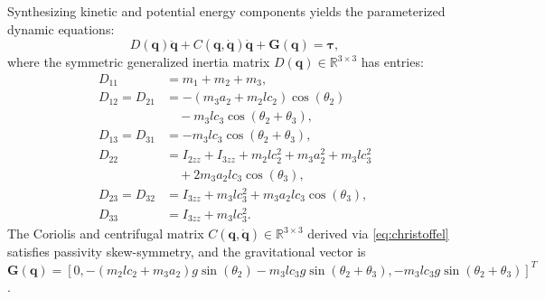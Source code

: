 \documentclass[lettersize,journal]{IEEEtran}
\begin{document}
Synthesizing kinetic and potential energy components yields the parameterized dynamic equations:
\begin{equation}
    D(\bm{q})\ddot{\bm{q}} + C(\bm{q}, \dot{\bm{q}})\dot{\bm{q}} + \bm{G}(\bm{q}) = \bm{\tau},
    \label{eq:dipc_dynamics}
\end{equation}
where the symmetric generalized inertia matrix $D(\bm{q}) \in \mathbb{R}^{3 \times 3}$ has entries:
\begin{align}
    D_{11} &= m_1 + m_2 + m_3, \label{eq:D11_dipc} \\
    D_{12} = D_{21} &= -(m_3 a_2 + m_2 lc_2)\cos(\theta_2) \nonumber \\
                    &\quad - m_3 lc_3 \cos(\theta_2 + \theta_3), \label{eq:D12_dipc} \\
    D_{13} = D_{31} &= -m_3 lc_3 \cos(\theta_2 + \theta_3), \label{eq:D13_dipc} \\
    D_{22} &= I_{2zz} + I_{3zz} + m_2 lc_2^2 + m_3 a_2^2 + m_3 lc_3^2 \nonumber \\
           &\quad + 2 m_3 a_2 lc_3 \cos(\theta_3), \label{eq:D22_dipc} \\
    D_{23} = D_{32} &= I_{3zz} + m_3 lc_3^2 + m_3 a_2 lc_3 \cos(\theta_3), \label{eq:D23_dipc} \\
    D_{33} &= I_{3zz} + m_3 lc_3^2. \label{eq:D33_dipc}
\end{align}
The Coriolis and centrifugal matrix $C(\bm{q}, \dot{\bm{q}}) \in \mathbb{R}^{3 \times 3}$ derived via \eqref{eq:christoffel} satisfies passivity skew-symmetry, and the gravitational vector is $\bm{G}(\bm{q}) = [0, -(m_2 lc_2 + m_3 a_2)g \sin(\theta_2) - m_3 lc_3 g \sin(\theta_2 + \theta_3), -m_3 lc_3 g \sin(\theta_2 + \theta_3)]^T$.
\end{document}
